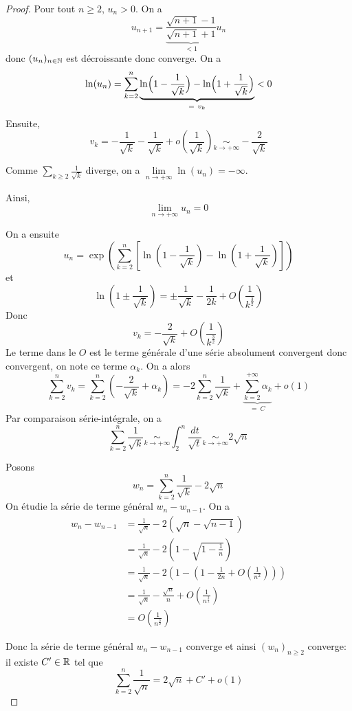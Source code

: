 \begin{proof}
	Pour tout $n\geqslant2$, $u_{n}>0$. On a 
	$$u_{n+1}=\underbrace{\frac{\sqrt{n+1}-1}{\sqrt{n+1}+1}}_{<1}u_{n}$$
	donc $(u_{n})_{n\in\mathbb{N}}$ est décroissante donc converge. On a 
	$$\ln(u_{n})=\sum_{k=2}^{n}\underbrace{\ln\Bigl(1-\frac{1}{\sqrt{k}}\Bigr)-\ln\Bigl(1+\frac{1}{\sqrt{k}}\Bigr)}_{=~v_{k}}<0$$
	Ensuite, 
	$$v_{k}=-\frac{1}{\sqrt{k}}-\frac{1}{\sqrt{k}}+o\left(\frac{1}{\sqrt{k}}\right)\underset{k\to+\infty}{\sim}-\frac{2}{\sqrt{k}}$$

	Comme $\sum_{k\geqslant2}\frac{1}{\sqrt{k}}$ diverge, on a $\lim\limits_{n\to+\infty}\ln(u_{n})=-\infty$.

	Ainsi, 
	$$\boxed{\lim\limits_{n\to+\infty}u_{n}=0}$$

	On a ensuite 
	$$u_{n}=\exp\left(\sum_{k=2}^{n}\left[\ln\left(1-\frac{1}{\sqrt{k}}\right)-\ln\left(1+\frac{1}{\sqrt{k}}\right)\right]\right)$$
	et 
	$$\ln\left(1\pm\frac{1}{\sqrt{k}}\right)=\pm\frac{1}{\sqrt{k}}-\frac{1}{2k}+O\left(\frac{1}{k^{\frac{3}{2}}}\right)$$
	Donc 
	$$v_{k}=-\frac{2}{\sqrt{k}}+O\left(\frac{1}{k^{\frac{3}{2}}}\right)$$
	Le terme dans le $O$ est le terme générale d'une série absolument convergent donc convergent, on note ce terme $\alpha_{k}$. On a alors 
	$$\sum_{k=2}^{n}v_{k}=\sum_{k=2}^{n}\left(-\frac{2}{\sqrt{k}}+\alpha_{k}\right)=-2\sum_{k=2}^{n}\frac{1}{\sqrt{k}}+\underbrace{\sum_{k=2}^{+\infty}\alpha_{k}}_{=~C}+o\left(1\right)$$
	Par comparaison série-intégrale, on a 
	$$\sum_{k=2}^{n}\frac{1}{\sqrt{k}}\underset{k\to+\infty}{\sim}\int_{2}^{n}\frac{dt}{\sqrt{t}}\underset{k\to+\infty}{\sim}2\sqrt{n}$$

	Posons 
	$$w_{n}=\sum_{k=2}^{n}\frac{1}{\sqrt{k}}-2\sqrt{n}$$
	On étudie la série de terme général $w_{n}-w_{n-1}$. On a 
	\begin{align*}
		w_{n}-w_{n-1}
		&=\frac{1}{\sqrt{n}}-2\left(\sqrt{n}-\sqrt{n-1}\right)\\
		&=\frac{1}{\sqrt{n}}-2\left(1-\sqrt{1-\frac{1}{n}}\right)\\
		&=\frac{1}{\sqrt{n}}-2\left(1-\left(1-\frac{1}{2n}+O\left(\frac{1}{n^{2}}\right)\right)\right)\\
		&=\frac{1}{\sqrt{n}}-\frac{\sqrt{n}}{n}+O\left(\frac{1}{n^{\frac{3}{2}}}\right)\\
		&=O\left(\frac{1}{n^{\frac{3}{2}}}\right)
	\end{align*}

	Donc la série de terme général $w_{n}-w_{n-1}$ converge et ainsi $(w_{n})_{n\geqslant2}$ converge: il existe $C'\in\mathbb{R}$ tel que 
	$$\sum_{k=2}^{n}\frac{1}{\sqrt{n}}=2\sqrt{n}+C'+o\left(1\right)$$


\end{proof}
